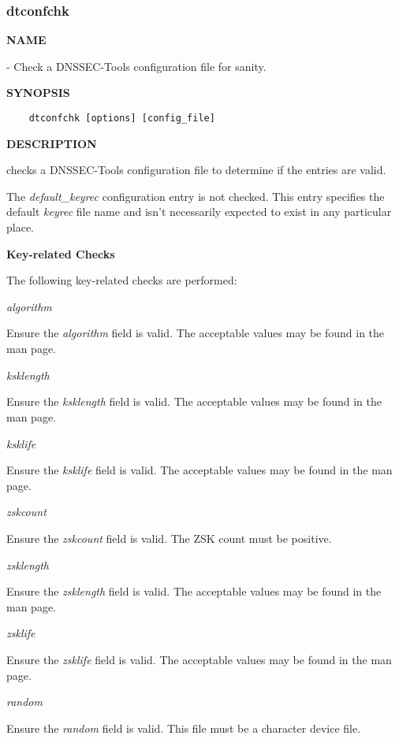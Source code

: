 \clearpage

\subsubsection{\bf dtconfchk}

{\bf NAME}

 - Check a DNSSEC-Tools configuration file for sanity.

{\bf SYNOPSIS}

\begin{verbatim}
    dtconfchk [options] [config_file]
\end{verbatim}

{\bf DESCRIPTION}

 checks a DNSSEC-Tools configuration file to determine if the
entries are valid.

The {\it default\_keyrec} configuration entry is not checked.  This entry
specifies the default {\it keyrec} file name and isn't necessarily expected
to exist in any particular place.

{\bf Key-related Checks}

The following key-related checks are performed:

\begin{description}

\item {\it algorithm}\verb" "

Ensure the {\it algorithm} field is valid.  The acceptable values may be found
in the  man page.

\item {\it ksklength}\verb" "

Ensure the {\it ksklength} field is valid.  The acceptable values may be found
in the  man page.

\item {\it ksklife}\verb" "

Ensure the {\it ksklife} field is valid.  The acceptable values may be found
in the  man page.

\item {\it zskcount}\verb" "

Ensure the {\it zskcount} field is valid.  The ZSK count must be positive.

\item {\it zsklength}\verb" "

Ensure the {\it zsklength} field is valid.  The acceptable values may be found
in the  man page.

\item {\it zsklife}\verb" "

Ensure the {\it zsklife} field is valid.  The acceptable values may be found
in the  man page.

\item {\it random}\verb" "

Ensure the {\it random} field is valid.  This file must be a character
device file.

\end{description}

